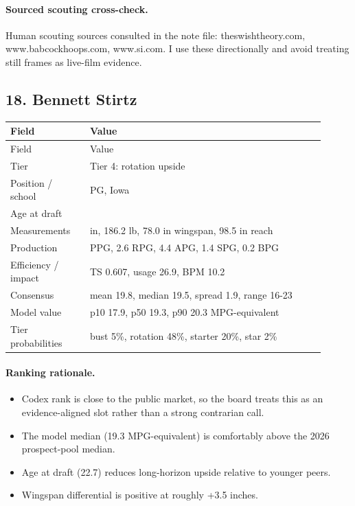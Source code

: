 \documentclass[11pt]{article}
\begin{document}
\paragraph{Sourced scouting cross-check.}
Human scouting sources consulted in the note file: theswishtheory.com, www.babcockhoops.com, www.si.com. I use these directionally and avoid treating still frames as live-film evidence.


\subsection{18. Bennett Stirtz}
\begin{center}
\scriptsize
\begin{longtable}{@{}>{\raggedright\arraybackslash}p{0.230\linewidth}>{\raggedright\arraybackslash}p{0.680\linewidth}@{}}
\toprule
Field & Value \\
\midrule
\endfirsthead
\toprule
Field & Value \\
\midrule
\endhead
Tier & Tier 4: rotation upside \\
Position / school & PG, Iowa \\
Age at draft & 22.7 \\
Measurements & 74.5 in, 186.2 lb, 78.0 in wingspan, 98.5 in reach \\
Production & 19.8 PPG, 2.6 RPG, 4.4 APG, 1.4 SPG, 0.2 BPG \\
Efficiency / impact & TS 0.607, usage 26.9, BPM 10.2 \\
Consensus & mean 19.8, median 19.5, spread 1.9, range 16-23 \\
Model value & p10 17.9, p50 19.3, p90 20.3 MPG-equivalent \\
Tier probabilities & bust 5\%, rotation 48\%, starter 20\%, star 2\% \\
\bottomrule
\end{longtable}
\end{center}

\paragraph{Ranking rationale.}
\begin{itemize}[leftmargin=*]
\item Codex rank is close to the public market, so the board treats this as an evidence-aligned slot rather than a strong contrarian call.
\item The model median (19.3 MPG-equivalent) is comfortably above the 2026 prospect-pool median.
\item Age at draft (22.7) reduces long-horizon upside relative to younger peers.
\item Wingspan differential is positive at roughly +3.5 inches.
\end{itemize}
\end{document}
